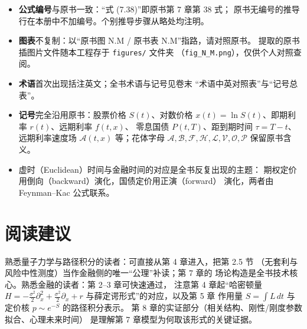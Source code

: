 \begin{itemize}[itemsep=0.2em]
\item \textbf{公式编号}与原书一致：“式 (7.38)”即原书第 7 章第 38 式；
      原书无编号的推导行在本册中不加编号。个别推导步骤从略处均注明。
\item \textbf{图表}不复制：以“原书图 N.M / 原书表 N.M”指路，请对照原书。
      提取的原书插图片文件随本工程存于 \texttt{figures/} 文件夹
      （\texttt{fig\_N\_M.png}），仅供个人对照查阅。
\item \textbf{术语}首次出现括注英文；全书术语与记号见卷末
      “术语中英对照表”与“记号总表”。
\item \textbf{记号}完全沿用原书：股票价格 $S(t)$、对数价格
      $x(t)=\ln S(t)$、即期利率 $r(t)$、远期利率 $f(t,x)$、
      零息国债 $P(t,T)$、距到期时间 $\tau=T-t$、远期利率速度场
      $\mathcal{A}(t,x)$ 等；花体字母
      $\mathcal{A},\mathcal{B},\mathcal{F},\mathcal{H},\mathcal{L},
      \mathcal{V},\mathcal{O},\mathcal{P}$ 保留原书含义。
\item 虚时（Euclidean）时间与金融时间的对应是全书反复出现的主题：
      期权定价用倒向（backward）演化，国债定价用正演（forward）
      演化，两者由 Feynman--Kac 公式联系。
\end{itemize}

\section*{阅读建议}

熟悉量子力学与路径积分的读者：可直接从第 4 章进入，把第 2.5 节
（无套利与风险中性测度）当作金融侧的唯一“公理”补读；第 7 章的
场论构造是全书技术核心。熟悉金融的读者：第 2--3 章可快速通过，
注意第 4 章起“哈密顿量 $H = -\frac{\sigma^2}{2}\partial_x^2 +
\frac{\sigma^2}{2}\partial_x + r$ 与薛定谔形式”的对应，以及第 5 章
作用量 $S = \int L\,dt$ 与定价核 $p \sim e^{-S}$ 的路径积分表示。
第 8 章的实证部分（相关结构、刚性/刚度参数拟合、心理未来时间）
是理解第 7 章模型为何取该形式的关键证据。
